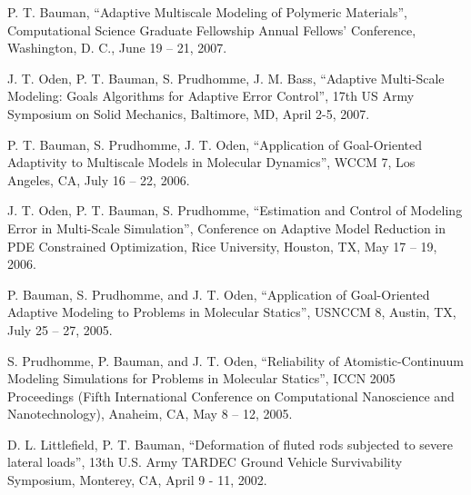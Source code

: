 \blankline

P. T. Bauman,
``Adaptive Multiscale Modeling of Polymeric Materials'',
Computational Science Graduate Fellowship Annual Fellows' Conference, Washington, D. C., June 19 -- 21, 2007.

\blankline

J. T. Oden, P. T. Bauman, S. Prudhomme, J. M. Bass,
``Adaptive Multi-Scale Modeling: Goals Algorithms for Adaptive Error Control'',
17th US Army Symposium on Solid Mechanics, Baltimore, MD, April 2-5, 2007.

\blankline

P. T. Bauman, S. Prudhomme, J. T. Oden,
``Application of Goal-Oriented Adaptivity to Multiscale Models in Molecular Dynamics'',
WCCM 7, Los Angeles, CA, July 16 -- 22, 2006.

\blankline

J. T. Oden, P. T. Bauman, S. Prudhomme,
``Estimation and Control of Modeling Error in Multi-Scale Simulation'',
Conference on Adaptive Model Reduction in PDE Constrained Optimization,
Rice University, Houston, TX, May 17 -- 19, 2006.

\blankline

P. Bauman, S. Prudhomme, and J. T. Oden,
``Application of Goal-Oriented Adaptive Modeling to Problems in Molecular Statics'',
USNCCM 8, Austin, TX, July 25 -- 27, 2005.

\blankline 

S. Prudhomme, P. Bauman, and J. T. Oden,
``Reliability of Atomistic-Continuum Modeling Simulations for Problems in Molecular Statics'',
ICCN 2005 Proceedings (Fifth International Conference on Computational Nanoscience and Nanotechnology),
Anaheim, CA, May 8 -- 12, 2005.

\blankline

D. L. Littlefield, P. T. Bauman,
``Deformation of fluted rods subjected to severe lateral loads'',
13th U.S. Army TARDEC Ground Vehicle Survivability Symposium, Monterey, CA, April 9 - 11, 2002.
